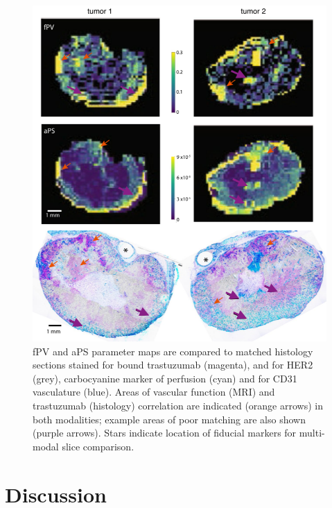 \begin{figure}[htbp] %
  \centering
  \includegraphics[width=\textwidth]{hpg/hpg-paper2-images/Fig6.png} 
  \caption{\acs{fPV} and \acs{aPS} parameter maps are compared to matched histology sections stained for bound trastuzumab (magenta), and for \acs{HER2} (grey), carbocyanine marker of perfusion (cyan) and for CD31 vasculature (blue). 
  Areas of vascular function (MRI) and trastuzumab (histology) correlation are indicated (orange arrows) in both modalities; example areas of poor matching are also shown (purple arrows). 
  Stars indicate location of fiducial markers for multi-modal slice comparison.}
  \label{hpgpaper2:fig6}
\end{figure}

\section{Discussion}

